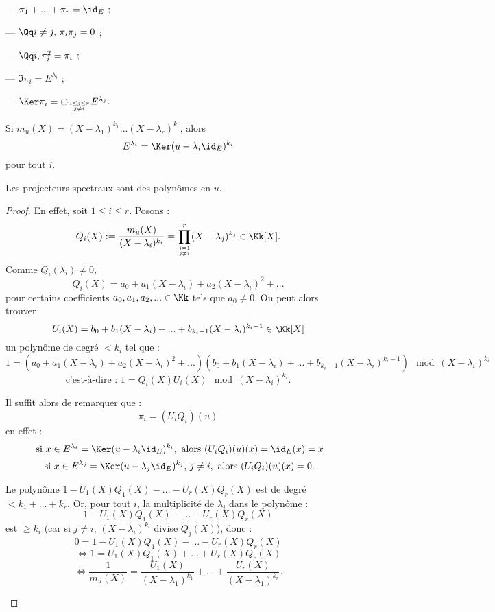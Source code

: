 \documentclass[class=report,crop=false]{standalone}
\begin{document}
--- $\pi_1+...+\pi_r =\id_E$ ;
 
--- $\Qq i\neq j,\, \pi_i\pi_j =0$ ;

--- $ \Qq i, \pi_i^2=\pi_i$ ;

--- $\Im \pi_i = E^{\lambda_i}$ ;

--- $\Ker \pi_i = \oplus_{1 \le j \le r \atop j \neq i}E^{\lambda_j}$.

\begin{remarque*}
Si $m_u(X) = (X-\lambda_1)^{k_1}...(X-\lambda_r)^{k_r}$, alors \[E^{\lambda_i} = \Ker(u-\lambda_i\id_E)^{k_i}\]
pour tout $i$.
\end{remarque*}

\begin{proposition}
Les projecteurs spectraux sont des polynômes en $u$.
\end{proposition}

\begin{proof}
En effet, soit $1 \le i \le r$. Posons :
\[Q_i(X):=\frac{m_u(X)}{(X-\lambda_i)^{k_i}} = \prod_{j=1\atop j \neq i}^r(X-\lambda_j)^{k_j} \in \Kk[X] .\]
Comme $Q_i(\lambda_i)\neq 0$, \[Q_i(X) = a_0 + a_1 (X-\lambda_i) + a_2 (X-\lambda_i)^2 +...\]
pour certains coefficients $a_0,a_1,a_2,... \in \Kk$ tels que $a_0\neq 0$. On peut alors trouver \[U_i(X) = b_0 + b_1(X-\lambda_i) + ... + b_{k_i-1}(X-\lambda_i)^{k_i-1} \in \Kk[X]\]
un polynôme de degré $< k_i$ tel que :
\[1 = (a_0 + a_1 (X-\lambda_i) + a_2 (X-\lambda_i)^2 +...)(b_0 + b_1(X-\lambda_i) + ... + b_{k_i-1}(X-\lambda_i)^{k_i-1}) \mod (X-\lambda_i)^{k_i}\]
\[\mbox{c'est-à-dire : } 1= Q_i(X)U_i(X) \mod (X-\lambda_i)^{k_i} .\]


Il suffit alors de remarquer que : \[\pi_i = (U_iQ_i)(u)\]
en effet :
\[\mbox{ si } x \in E^{\lambda_i} =\Ker (u-\lambda_i\id_E)^{k_i},\mbox{ alors } (U_iQ_i)(u)(x) = \id_E(x) = x\]
\[\mbox{ si } x \in E^{\lambda_j} = \Ker (u-\lambda_j\id_E)^{k_j},\,j\neq i,\mbox{ alors } (U_iQ_i)(u)(x) =0.\]  

\begin{remarque*}
Le polynôme $1-U_1(X)Q_1(X) - ... -U_r(X)Q_r(X)$ est de degré $< k_1+...+k_r$. Or, pour tout $i$, la multiplicité de $\lambda_i$ dans le polynôme :
\[1-U_1(X)Q_1(X) - ... -U_r(X)Q_r(X)\] 
est $\ge k_i$ (car si $j \neq i$, $(X-\lambda_i)^{k_i}$ divise $Q_j( X)$), donc : 
\[0 = 1-U_1(X)Q_1(X) - ... -U_r(X)Q_r(X)\]
\[\iff 1 =U_1(X)Q_1(X) + ... +U_r(X)Q_r(X)\]
\[\iff \frac{1}{m_u(X)} = \frac{U_1(X)}{(X-\lambda_1)^{k_1}} + ... + \frac{U_r(X)}{(X-\lambda_1)^{k_r}} . \]
\end{remarque*}
\end{proof}
\end{document}
